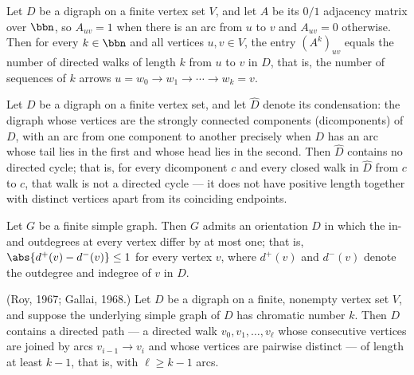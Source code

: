 \begin{theorem}
\label{adjMatrix_pow_apply_eq_card_directedWalk}
\leanok
{}
Let $D$ be a digraph on a finite vertex set $V$, and let $A$ be its $0/1$ adjacency
matrix over $\bbn$, so $A_{uv} = 1$ when there is an arc from $u$ to $v$ and $A_{uv} =
0$ otherwise. Then for every $k \in \bbn$ and all vertices $u, v \in V$, the entry
$(A^k)_{uv}$ equals the number of directed walks of length $k$ from $u$ to $v$ in $D$,
that is, the number of sequences of $k$ arrows $u = w_0 \to w_1 \to \cdots \to w_k = v$.
\end{theorem}

\begin{theorem}
\label{condensation_acyclic}
\leanok
{}
Let $D$ be a digraph on a finite vertex set, and let $\hat{D}$ denote its condensation:
the digraph whose vertices are the strongly connected components (dicomponents) of $D$,
with an arc from one component to another precisely when $D$ has an arc whose tail lies
in the first and whose head lies in the second. Then $\hat{D}$ contains no directed
cycle; that is, for every dicomponent $c$ and every closed walk in $\hat{D}$ from $c$ to
$c$, that walk is not a directed cycle — it does not have positive length together with
distinct vertices apart from its coinciding endpoints.
\end{theorem}

\begin{theorem}
\label{exists_balanced_orientation}
\leanok
{}
Let $G$ be a finite simple graph. Then $G$ admits an orientation $D$ in which the in-
and outdegrees at every vertex differ by at most one; that is, $\abs{d^{+}(v) -
d^{-}(v)} \le 1$ for every vertex $v$, where $d^{+}(v)$ and $d^{-}(v)$ denote the
outdegree and indegree of $v$ in $D$.
\end{theorem}

\begin{theorem}
\label{roy_gallai_directed_path}
\leanok
{}
(Roy, 1967; Gallai, 1968.) Let $D$ be a digraph on a finite, nonempty vertex set $V$,
and suppose the underlying simple graph of $D$ has chromatic number $k$. Then $D$
contains a directed path — a directed walk $v_0, v_1, \dots, v_\ell$ whose consecutive
vertices are joined by arcs $v_{i-1} \to v_i$ and whose vertices are pairwise distinct —
of length at least $k - 1$, that is, with $\ell \ge k - 1$ arcs.
\end{theorem}

